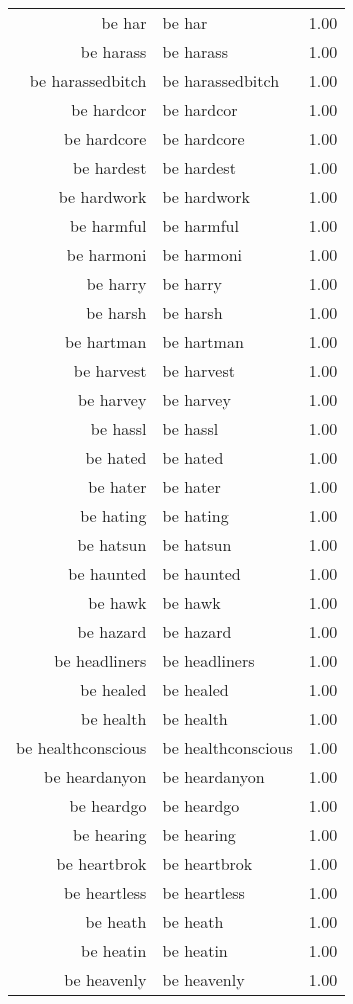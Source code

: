 \begin{table}[ht]
\begin{tabular}{rlr}
  be har & be har & 1.00 \\ 
  be harass & be harass & 1.00 \\ 
  be harassedbitch & be harassedbitch & 1.00 \\ 
  be hardcor & be hardcor & 1.00 \\ 
  be hardcore & be hardcore & 1.00 \\ 
  be hardest & be hardest & 1.00 \\ 
  be hardwork & be hardwork & 1.00 \\ 
  be harmful & be harmful & 1.00 \\ 
  be harmoni & be harmoni & 1.00 \\ 
  be harry & be harry & 1.00 \\ 
  be harsh & be harsh & 1.00 \\ 
  be hartman & be hartman & 1.00 \\ 
  be harvest & be harvest & 1.00 \\ 
  be harvey & be harvey & 1.00 \\ 
  be hassl & be hassl & 1.00 \\ 
  be hated & be hated & 1.00 \\ 
  be hater & be hater & 1.00 \\ 
  be hating & be hating & 1.00 \\ 
  be hatsun & be hatsun & 1.00 \\ 
  be haunted & be haunted & 1.00 \\ 
  be hawk & be hawk & 1.00 \\ 
  be hazard & be hazard & 1.00 \\ 
  be headliners & be headliners & 1.00 \\ 
  be healed & be healed & 1.00 \\ 
  be health & be health & 1.00 \\ 
  be healthconscious & be healthconscious & 1.00 \\ 
  be heardanyon & be heardanyon & 1.00 \\ 
  be heardgo & be heardgo & 1.00 \\ 
  be hearing & be hearing & 1.00 \\ 
  be heartbrok & be heartbrok & 1.00 \\ 
  be heartless & be heartless & 1.00 \\ 
  be heath & be heath & 1.00 \\ 
  be heatin & be heatin & 1.00 \\ 
  be heavenly & be heavenly & 1.00 \\ 

\end{tabular}
\end{table}
